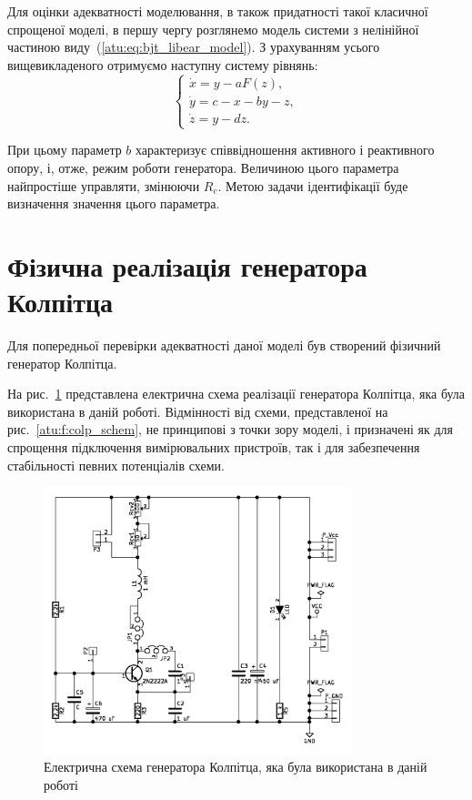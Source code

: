 Для оцінки адекватності моделювання, в також придатності
такої класичної спрощеної моделі, в першу чергу розглянемо
модель системи з нелінійної частиною виду~(\ref{atu:eq:bjt_libear_model}). З
урахуванням усього вищевикладеного отримуємо наступну систему
рівнянь:
%
\begin{equation}
\label{atu:eq:colp}
\begin{cases}
  \dot{x} = y - a F(z), \\
  \dot{y} = c - x - by - z, \\
  \dot{z} = y - d z.
\end{cases}
\end{equation}

При цьому параметр
$ b $ характеризує співвідношення активного і реактивного опору,
і, отже, режим роботи генератора. Величиною цього параметра
найпростіше управляти, змінюючи
$ R_c $. Метою задачи ідентифікації буде визначення значення
цього параметра.




\section{Фізична реалізація генератора Колпітца} %

Для попередньої перевірки адекватності даної моделі був
створений фізичний генератор Колпітца.

На рис.~\ref{atu:f:colp_schem_real} представлена електрична схема
реалізації генератора Колпітца, яка була використана в даній
роботі. Відмінності від схеми, представленої на рис.~\ref{atu:f:colp_schem},
не принципові з точки зору моделі, і призначені як для спрощення
підключення вимірювальних пристроїв, так і для забезпечення
стабільності певних потенціалів схеми.

\begin{figure}[htb!]
\centerline{\includegraphics[width=0.8\textwidth]{p/colp_schem_real.png} }
\caption{Електрична схема генератора Колпітца, яка була використана в даній роботі}
\label{atu:f:colp_schem_real}
\end{figure}

